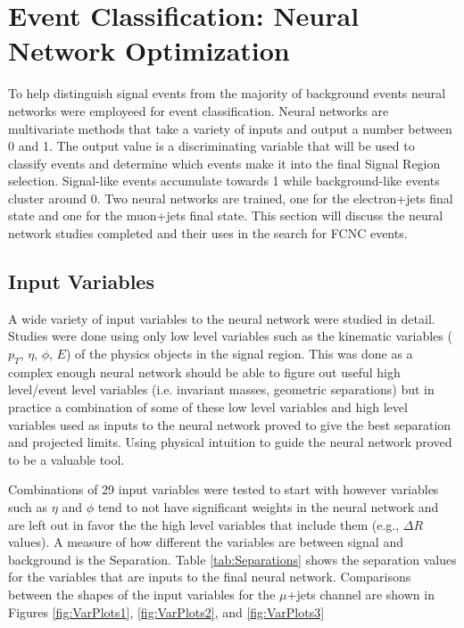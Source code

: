 
\section{Event Classification: Neural Network Optimization}
\label{sec:NN} 
To help distinguish signal events from the majority of background events neural networks were employeed for event classification.  Neural networks are multivariate methods that take a variety of inputs and output a number between 0 and 1.  The output value is a discriminating variable that will be used to classify events and determine which events make it into the final Signal Region selection.  Signal-like events accumulate towards 1 while background-like events cluster around 0.  Two neural networks are trained, one for the electron+jets final state and one for the muon+jets final state.  This section will discuss the neural network studies completed and their uses in the search for FCNC events.  

\subsection{Input Variables}
A wide variety of input variables to the neural network were studied in detail.  Studies were done using only low level variables such as the kinematic variables  ($p_T$, $\eta$, $\phi$, $E$)  of the physics objects in the signal region.  This was done as a complex enough neural network should be able to figure out useful high level/event level variables (i.e. invariant masses, geometric separations) but in practice a combination of some of these low level variables and high level variables used as inputs to the neural network proved to give the best separation and projected limits.  Using physical intuition to guide the neural network proved to be a valuable tool.

Combinations of 29 input variables were tested to start with however variables such as $\eta$ and $\phi$ tend to not have significant weights in the neural network and are left out in favor the the high level variables that include them (e.g., $\Delta R$ values).  A measure of how different the variables are between signal and background is the Separation.  Table \ref{tab:Separations} shows the separation values for the variables that are inputs to the final neural network.  Comparisons between the shapes of the input variables for the $\mu$+jets channel are shown in Figures \ref{fig:VarPlots1}, \ref{fig:VarPlots2}, and \ref{fig:VarPlots3}

